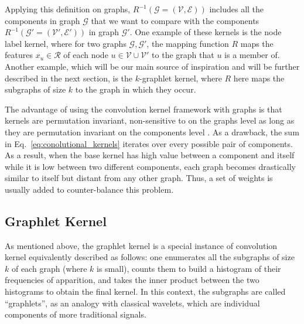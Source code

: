 Applying this definition on graphs, $R^{-1}(\mathcal{G}=(\mathcal{V},\mathcal{E}))$ includes all the components in graph $\mathcal{G}$  that we want to compare with the components $R^{-1}(\mathcal{G'}=(\mathcal{V}',\mathcal{E}'))$ in graph $\mathcal{G'}$. One example of these kernels is the node label kernel, where for two graphs $\mathcal{G}, \mathcal{G'}$, the mapping function $R$ maps the features $x_u\in \mathcal{R}$ of each node $u\in \mathcal{V}\cup \mathcal{V'}$ to the graph that $u$ is a member of.  Another example, which will be our main source of inspiration and will be further described in the next section, is the $k$-graphlet kernel, where $R$ here maps the subgraphs of size $k$ to the graph in which they occur.
 
The advantage of using the convolution kernel framework with graphs is that kernels are permutation invariant, non-sensitive to  on the graphs level as long as they are permutation invariant on the components level . As a drawback, the sum in Eq.~\ref{eq:conolutional_kernels} iterates over every possible pair of components. As a result, when the base kernel has high value between a component and itself while it is low between two different components, each graph becomes drastically similar to itself but distant from any other graph. Thus, a set of weights is usually added to counter-balance this problem.

\subsection{Graphlet Kernel}
\label{subsection: graphlet kernel}

As mentioned above, the graphlet kernel is a special instance of convolution kernel equivalently described as follows: one enumerates all the subgraphs of size $k$ of each graph (where $k$ is small), counts them to build a histogram of their frequencies of apparition, and takes the inner product between the two histograms to obtain the final kernel. In this context, the subgraphs are called ``graphlets'', as an analogy with classical wavelets, which are individual components of more traditional signals.

